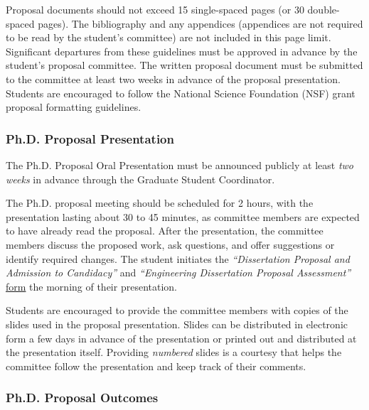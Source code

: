 Proposal documents should not exceed 15 single-spaced pages (or 30
double-spaced pages). The bibliography and any appendices (appendices
are not required to be read by the student's committee) are not included
in this page limit. Significant departures from these guidelines must be
approved in advance by the student's proposal committee. The written
proposal document must be submitted to the committee at least two weeks
in advance of the proposal presentation.
Students are encouraged to
follow the National Science Foundation (NSF) grant proposal formatting
guidelines.

\hypertarget{phd-proposal-presentation}{
\subsubsection{Ph.D. Proposal Presentation}
\label{phd-proposal-presentation}
}

The Ph.D. Proposal Oral Presentation must be  announced publicly at least
\emph{two weeks} in advance through the Graduate Student Coordinator.

The Ph.D. proposal meeting should be scheduled for 2 hours, with the presentation lasting about 30 to 45 minutes, as committee members are expected to have already read the proposal.
After the presentation, the committee
members discuss the proposed work, ask questions, and offer suggestions
or identify required changes. The student initiates the
{\emph{``Dissertation
Proposal and Admission to Candidacy''}} and \emph{``Engineering Dissertation
Proposal Assessment''} \href{https://engineering.virginia.edu/graduate-study/current-graduate-students/academic-planning/forms-graduate-students}{form} the morning of their presentation.

Students are encouraged to provide the committee members with copies of
the slides used in the proposal presentation. Slides can be distributed
in electronic form a few days in advance of the presentation or printed
out and distributed at the presentation itself. Providing
\emph{numbered} slides is a courtesy that helps the committee follow the
presentation and keep track of their comments.

\hypertarget{phd-proposal-outcomes}{%
\subsubsection{Ph.D. Proposal Outcomes}\label{phd-proposal-outcomes}}

